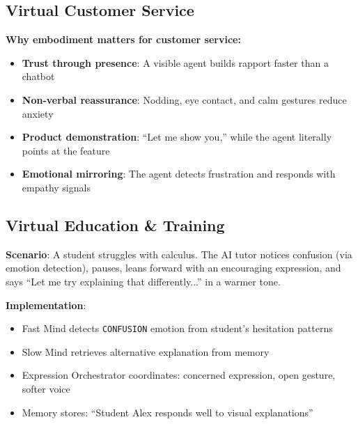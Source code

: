 \documentclass[11pt,letterpaper]{article}
\begin{document}
\subsection{Virtual Customer Service}

\begin{center}
\end{center}

\textbf{Why embodiment matters for customer service:}
\begin{itemize}
  \item \textbf{Trust through presence}: A visible agent builds rapport faster than a chatbot
  \item \textbf{Non-verbal reassurance}: Nodding, eye contact, and calm gestures reduce anxiety
  \item \textbf{Product demonstration}: ``Let me show you,'' while the agent literally points at the feature
  \item \textbf{Emotional mirroring}: The agent detects frustration and responds with empathy signals
\end{itemize}

\subsection{Virtual Education \& Training}

\begin{systembox}
\textbf{Scenario}: A student struggles with calculus. The AI tutor notices confusion (via emotion detection), pauses, leans forward with an encouraging expression, and says ``Let me try explaining that differently...'' in a warmer tone.

\vspace{0.5em}
\textbf{Implementation}:
\begin{itemize}[nosep]
  \item Fast Mind detects \texttt{CONFUSION} emotion from student's hesitation patterns
  \item Slow Mind retrieves alternative explanation from memory
  \item Expression Orchestrator coordinates: concerned expression, open gesture, softer voice
  \item Memory stores: ``Student Alex responds well to visual explanations''
\end{itemize}
\end{systembox}
\end{document}

